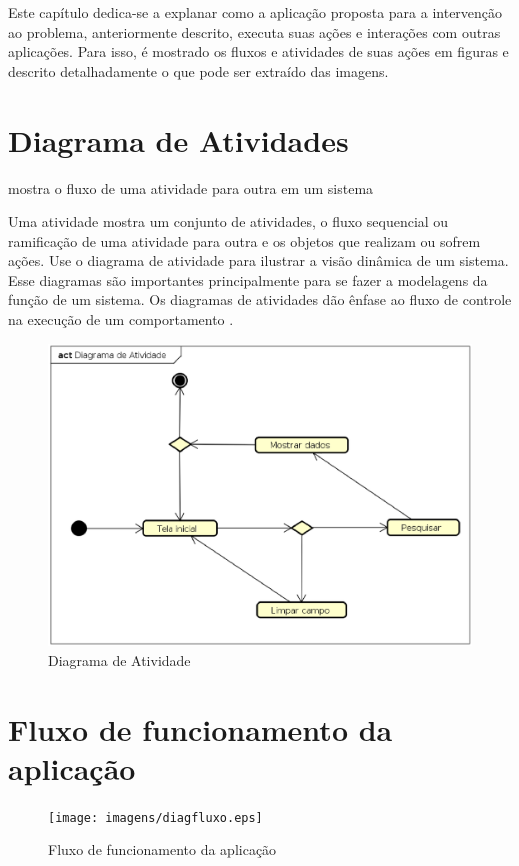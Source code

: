Este capítulo dedica-se a explanar como a aplicação proposta para a intervenção ao problema, anteriormente descrito, executa suas ações e interações com outras aplicações. Para isso, é mostrado os fluxos e atividades de suas ações em figuras e descrito detalhadamente o que pode ser extraído das imagens.

\section{Diagrama de Atividades}
mostra o fluxo de uma atividade para outra em um sistema

Uma atividade mostra um conjunto de atividades, o fluxo sequencial ou ramificação de uma atividade para outra e os objetos que realizam ou sofrem ações. Use o diagrama de atividade para ilustrar a visão dinâmica de um sistema. Esse diagramas são importantes principalmente para se fazer a modelagens da função de um sistema. Os diagramas de atividades dão ênfase ao fluxo de controle na execução de um comportamento \cite{Booch:2012}.

\begin{figure}[!htb]
        \caption{\label{diagrama1}Diagrama de Atividade}
        \begin{center}
                \includegraphics[width=\textwidth]{imagens/diagact.eps}
        \end{center}
\end{figure}

\section{Fluxo de funcionamento da aplicação}

\begin{figure}[!htb]
        \caption{\label{diagrama1}Fluxo de funcionamento da aplicação}
        \begin{center}
                \texttt{[image: imagens/diagfluxo.eps]}
        \end{center}
\end{figure}
